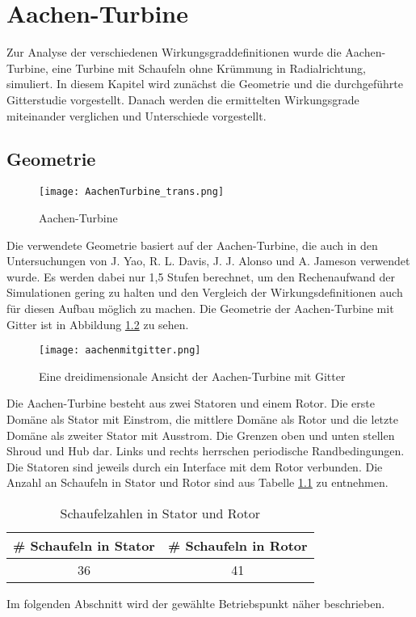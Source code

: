 \chapter{Aachen-Turbine}
\label{cha:aachen}
Zur Analyse der verschiedenen Wirkungsgraddefinitionen wurde die Aachen-Turbine, eine Turbine mit Schaufeln ohne Krümmung in Radialrichtung, simuliert. In diesem Kapitel wird zunächst die Geometrie und die durchgeführte Gitterstudie vorgestellt. Danach werden die ermittelten Wirkungsgrade miteinander verglichen und Unterschiede vorgestellt.
\section{Geometrie}
\label{sec:aachengeo}
  \begin{figure}[htbp]
	\centering
	\texttt{[image: AachenTurbine\_trans.png]}
	\caption{Aachen-Turbine} \label{fig:imgAachenTurbine}
\end{figure} 
Die verwendete Geometrie basiert auf der Aachen-Turbine, die auch in den Untersuchungen von J. Yao, R. L. Davis, J. J. Alonso und A. Jameson\cite{ufi2001YaoDavis} 
verwendet wurde. Es werden dabei nur 1,5 Stufen berechnet, um den Rechenaufwand der Simulationen gering zu halten und den Vergleich der Wirkungsdefinitionen auch für diesen Aufbau möglich zu machen. Die Geometrie der Aachen-Turbine mit Gitter ist in Abbildung \ref{fig:aachengebiet} zu sehen. 
\begin{figure}[htbp]
	\centering
	\texttt{[image: aachenmitgitter.png]}
	\caption{Eine dreidimensionale Ansicht der Aachen-Turbine mit Gitter}
	\label{fig:aachengebiet}
\end{figure}
Die Aachen-Turbine besteht aus zwei Statoren und einem Rotor. Die erste Domäne als Stator mit Einstrom, die mittlere Domäne als Rotor und die letzte Domäne als zweiter Stator mit Ausstrom. Die Grenzen oben und unten stellen Shroud und Hub dar. Links und rechts herrschen periodische Randbedingungen. Die Statoren sind jeweils durch ein Interface mit dem Rotor verbunden. Die Anzahl an Schaufeln in Stator und Rotor sind aus Tabelle \ref{tab:aachenabmessungen} zu entnehmen.\newline
\begin{table}[htbp]
\centering
\label{tab:aachenabmessungen}
\caption{Schaufelzahlen in Stator und Rotor}
\begin{tabular}{ c| c}
\# Schaufeln in Stator&\# Schaufeln in Rotor\\
\hline
36&41\\
\end{tabular}
\end{table}
Im folgenden Abschnitt wird der gewählte Betriebspunkt näher beschrieben.
